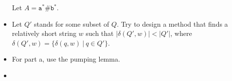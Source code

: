 \begin{itemize}
\begin{comment}
	\hint
	\end{comment}
	Let $A = \mathtt{a}^* \texttt{\#} \mathtt{b}^*$. 
	
	
	\item[\hard 1.59]
	\begin{comment}
	Let $M = (Q, \Sigma, \delta, q_0, F)$ be a DFA and let $h$ be a state of $M$ called its ``home''. A \bm{synchronizing sequence} for $M$ and $h$ is a string $s \in \Sigma^*$ where $\delta(q, s) = h$ for every $q \in Q$. (Here we have extended $\delta$ to strings, so that $\delta(q, s)$ equals the state where $M$ ends up when $M$ starts at state $q$ and reads input $s$.) Say that $M$ is \bm{synchronizable} if it has a synchronizing sequence for some state $h$. Prove that if $M$ is a $k$-state synchronizable DFA, then it has a synchronizing sequence of length at most $k^3$. Can you improve upon this bound?
	
	\hint
	\end{comment}
	Let $Q'$ stands for some subset of $Q$. Try to design a method that finds a relatively short string $w$ such that $|\delta(Q', w)| < |Q'|$, where $\delta(Q', w) = \{ \delta(q, w) \ | \ q \in Q' \}$.
	
	
	\item[\hard 1.63] 
	\begin{comment}
	\begin{itemize}
		\item[a.]
		Let $A$ be an infinite regular language. Prove that $A$ can be split into two infinite disjoint regular subsets.
		\item[b.]
		Let $B$ and $D$ be two languages. Write $B \Subset D$ if $B \subseteq D$ and $D$ contains infinitely many strings that are not in $B$. Show that if $B$ and $D$ are two regular languages where $B \Subset D$, then we can find a regular language $C$ where $B \Subset C \Subset D$.
	\end{itemize}

	\hint
	\end{comment}
	For part a, use the pumping lemma.


	\item[\hard 1.65]
	\begin{comment}
	Prove that for each $n>0$, a language $B_n$ exists where
	\begin{itemize}
		\item[a.]
		$B_n$ is recognizable by an NFA that has $n$ states, and
		\item[b.]
		if $B_n = A_1 \cup \cdots \cup A_k$ for regular languages $A_i$, then at least one of the $A_i$ requires a DFA with exponentially many states.
	\end{itemize}


\end{comment}
\end{itemize}
